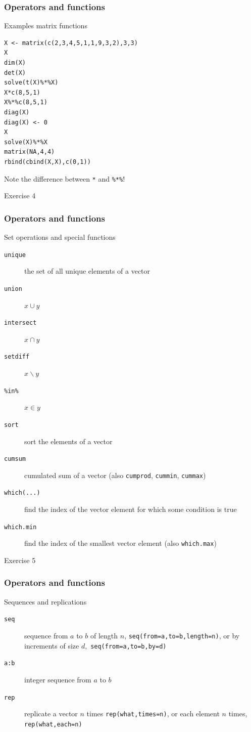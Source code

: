 \documentclass[xcolor={svgnames},10pt,
handout
]{beamer}
\begin{document}
\begin{frame}[fragile]
\frametitle{Operators and functions}
Examples matrix functions
\begin{lstlisting}
X <- matrix(c(2,3,4,5,1,1,9,3,2),3,3)
X
dim(X)
det(X)
solve(t(X)%*%X)
X*c(8,5,1)
X%*%c(8,5,1)
diag(X)
diag(X) <- 0
X
solve(X)%*%X
matrix(NA,4,4)
rbind(cbind(X,X),c(0,1))
\end{lstlisting}
Note the difference between \texttt{*} and \texttt{\%*\%}!
\end{frame}

\begin{frame}[standout]
Exercise 4
\end{frame}


\begin{frame}
\frametitle{Operators and functions}
Set operations and special functions
\begin{description}
\item[\texttt{unique}] the set of all unique elements of a vector
\item[\texttt{union}] $x\cup y$
\item[\texttt{intersect}] $x\cap y$
\item[\texttt{setdiff}] $x\backslash y$
\item[\texttt{\%in\%}] $x\in y$
\item[\texttt{sort}] sort the elements of a vector
\item[\texttt{cumsum}] cumulated sum of a vector \newline
(also \texttt{cumprod}, \texttt{cummin}, \texttt{cummax})
\item[\texttt{which(...)}] find the index of the vector element for which some condition is true
\item[\texttt{which.min}] find the index of the smallest vector element 
\newline
(also \texttt{which.max})
\end{description}
\end{frame}

\begin{frame}[standout]
Exercise 5
\end{frame}


\begin{frame}
\frametitle{Operators and functions}
Sequences and replications
\begin{description}
\item[\texttt{seq}] sequence from $a$ to $b$ of length $n$, \newline
\texttt{seq(from=a,to=b,length=n)}, \newline
or by increments of size $d,$ \newline
\texttt{seq(from=a,to=b,by=d)}
\item[\texttt{a:b}] integer sequence from $a$ to $b$
\item[\texttt{rep}] replicate a vector $n$ times\newline
\texttt{rep(what,times=n)},\newline
or each element $n$ times,\newline
\texttt{rep(what,each=n)}
\end{description}
\end{frame}
\end{document}

